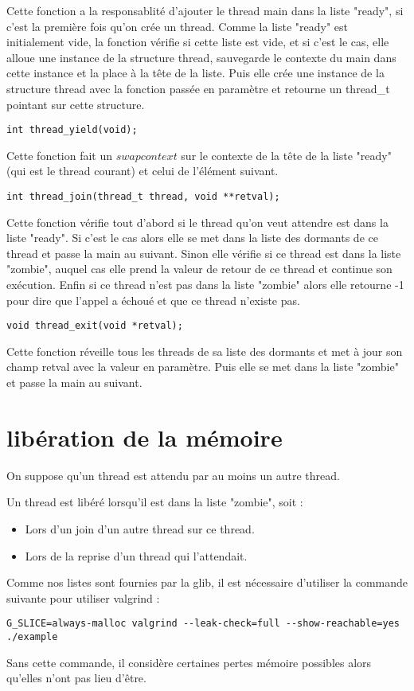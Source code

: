 Cette fonction a la responsablité d'ajouter le thread main dans la
liste "ready", si c'est la première fois qu'on crée un thread.  Comme
la liste "ready" est initialement vide, la fonction vérifie si cette
liste est vide, et si c'est le cas, elle alloue une instance de la
structure thread, sauvegarde le contexte du main dans cette instance
et la place à la tête de la liste.  Puis elle crée une instance de la
structure thread avec la fonction passée en paramètre et retourne un
thread\_t pointant sur cette structure.  ~~\\
\begin{verbatim}
int thread_yield(void);
\end{verbatim}
Cette fonction fait un $swapcontext$ sur le contexte de la tête de la
liste "ready" (qui est le thread courant) et celui de l'élément
suivant.  ~~\\
\begin{verbatim}
int thread_join(thread_t thread, void **retval);
\end{verbatim}
Cette fonction vérifie tout d'abord si le thread qu'on veut attendre
est dans la liste "ready". Si c'est le cas alors elle se met dans la
liste des dormants de ce thread et passe la main au suivant.  Sinon
elle vérifie si ce thread est dans la liste "zombie", auquel cas
elle prend la valeur de retour de ce thread et continue son exécution.
Enfin si ce thread n'est pas dans la liste "zombie" alors elle
retourne -1 pour dire que l'appel a échoué et que ce thread n'existe
pas.  ~~\\
\begin{verbatim}
void thread_exit(void *retval);
\end{verbatim}
Cette fonction réveille tous les threads de sa liste des dormants et
met à jour son champ retval avec la valeur en paramètre. Puis elle se
met dans la liste "zombie" et passe la main au suivant.

\section{libération de la mémoire}
On suppose qu'un thread est attendu par au moins un autre thread.

Un thread est libéré lorsqu'il est dans la liste "zombie", soit :
\begin{itemize}
\item Lors d'un join d'un autre thread sur ce thread.
\item Lors de la reprise d'un thread qui l'attendait.
\end{itemize}

Comme nos listes sont fournies par la glib, il est nécessaire
d'utiliser la commande suivante pour utiliser valgrind :
\begin{verbatim}
G_SLICE=always-malloc valgrind --leak-check=full --show-reachable=yes ./example 
\end{verbatim}
Sans cette commande, il considère certaines pertes mémoire possibles
alors qu'elles n'ont pas lieu d'être.

